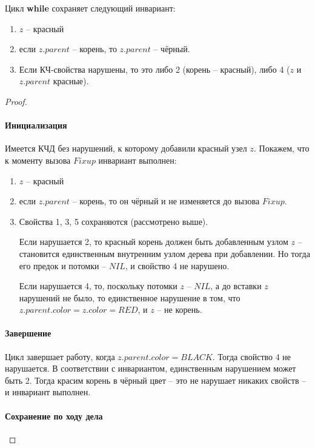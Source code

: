 \documentclass[a4paper,12pt]{article}
\begin{document}
\begin{theorem}
Цикл \textbf{while} сохраняет следующий инвариант:
\begin{enumerate}
    \item $z$ -- красный
    \item если $z.parent$ -- корень, то $z.parent$ -- чёрный.
    \item Если КЧ-свойства нарушены, то это либо 2 (корень -- красный), либо 4 ($z$ и $z.parent$ красные).
\end{enumerate}
\end{theorem}
\begin{proof}
\ 
    \paragraph{Инициализация}
    
    Имеется КЧД без нарушений, к которому добавили красный узел $z$. Покажем, что к моменту вызова $Fixup$ инвариант выполнен:
    \begin{enumerate}
        \item $z$ -- красный
        \item если $z.parent$ -- корень, то он чёрный и не изменяется до вызова $Fixup$.
        \item Свойства 1, 3, 5 сохраняются (рассмотрено выше).
        
        Если нарушается 2, то красный корень должен быть добавленным узлом $z$ -- становится единственным внутренним узлом дерева при добавлении. Но тогда его предок и потомки -- $NIL$, и свойство 4 не нарушено.
        
        Если нарушается 4, то, поскольку потомки $z$ -- $NIL$, а до вставки $z$ нарушений не было, то единственное нарушение в том, что $z.parent.color = z.color = RED$, и $z$ -- не корень.
    \end{enumerate}
    
    \paragraph{Завершение}
    
    Цикл завершает работу, когда $z.parent.color = BLACK$. Тогда свойство 4 не нарушается. В соответствии с инвариантом, единственным нарушением может быть 2. Тогда красим корень в чёрный цвет -- это не нарушает никаких свойств -- и инвариант выполнен.
    
    \paragraph{Сохранение по ходу дела}
    

\end{proof}
\end{document}
